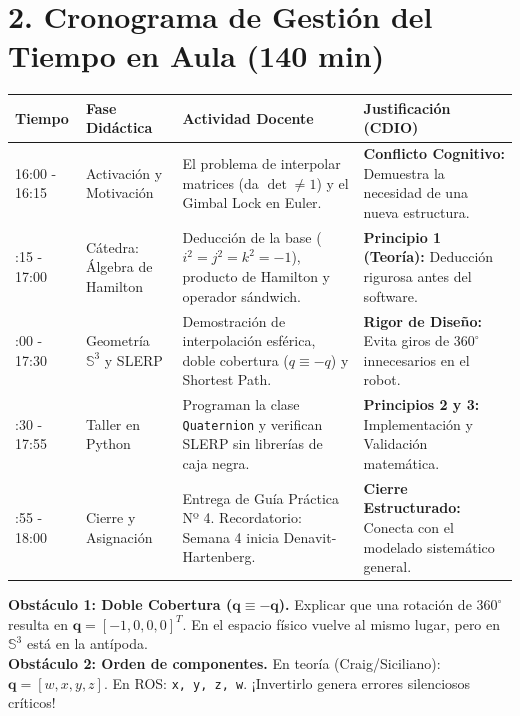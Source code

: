 \documentclass[11pt, a4paper]{article}
\begin{document}
\section*{2. Cronograma de Gestión del Tiempo en Aula (140 min)}
\noindent
\begin{tabularx}{\textwidth}{@{} l >{\raggedright\arraybackslash}p{3.2cm} X X @{}}
\toprule
\textbf{Tiempo} & \textbf{Fase Didáctica} & \textbf{Actividad Docente} & \textbf{Justificación (CDIO)} \\ \midrule
16:00 - 16:15 & Activación y Motivación & El problema de interpolar matrices (da $\det \neq 1$) y el Gimbal Lock en Euler. & \textbf{Conflicto Cognitivo:} Demuestra la necesidad de una nueva estructura. \\ \addlinespace
16:15 - 17:00 & Cátedra: Álgebra de Hamilton & Deducción de la base ($i^2=j^2=k^2=-1$), producto de Hamilton y operador sándwich. & \textbf{Principio 1 (Teoría):} Deducción rigurosa antes del software. \\ \addlinespace
17:00 - 17:30 & Geometría $\mathbb{S}^3$ y SLERP & Demostración de interpolación esférica, doble cobertura ($q \equiv -q$) y Shortest Path. & \textbf{Rigor de Diseño:} Evita giros de $360^\circ$ innecesarios en el robot. \\ \addlinespace
17:30 - 17:55 & Taller en Python & Programan la clase \texttt{Quaternion} y verifican SLERP sin librerías de caja negra. & \textbf{Principios 2 y 3:} Implementación y Validación matemática. \\ \addlinespace
17:55 - 18:00 & Cierre y Asignación & Entrega de Guía Práctica Nº 4. Recordatorio: Semana 4 inicia Denavit-Hartenberg. & \textbf{Cierre Estructurado:} Conecta con el modelado sistemático general. \\ \bottomrule
\end{tabularx}

\vspace{0.4cm}
\begin{tcolorbox}[colback=red!5!white, colframe=red!75!black, title=\textbf{3. Obstáculos Conceptuales Típicos}]
\textbf{Obstáculo 1: Doble Cobertura ($\mathbf{q} \equiv -\mathbf{q}$).} Explicar que una rotación de $360^\circ$ resulta en $\mathbf{q} = [-1, 0, 0, 0]^T$. En el espacio físico vuelve al mismo lugar, pero en $\mathbb{S}^3$ está en la antípoda.\\
\textbf{Obstáculo 2: Orden de componentes.} En teoría (Craig/Siciliano): $\mathbf{q} = [w, x, y, z]$. En ROS: \texttt{x, y, z, w}. ¡Invertirlo genera errores silenciosos críticos!
\end{tcolorbox}
\end{document}

